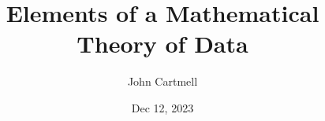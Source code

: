 
\usepackage{mathptmx}
\usepackage{amsfonts}
\usepackage{wasysym}
\usepackage{url}
\usepackage{hyperref}

\newcommand{\sharedmacros}{../../../SharedMacros}










\renewcommand{\erpictureFolder}[0]{../../SharedPictures}
\setcounter{equation}{0}




\title[John Cartmell]{Elements of a Mathematical Theory of Data}

\author{John Cartmell}
\institute{\\}
\date{Dec 12, 2023}

\usepackage{framed}
\usepackage{bibentry}
\usepackage{colortbl}
\usepackage{ulem}   %
\usepackage{soul,xcolor} %

\usepackage{listings}
\usepackage{arydshln} %
\usepackage{pst-arrow} %




\newcommand{\slidecontext}{Introduction} %

\newcommand{\comingnext}[1]{
\begin{frame}{COMING NEXT}
\begin{center}
\Large #1
\end{center}
\end{frame}
}

\newcommand{\fgsourcediag}{$\binarysourcediag{a}{b}{c}{f}{g}$}
\newcommand{\rangeplus}{$\mbox{range}^+\ $}



